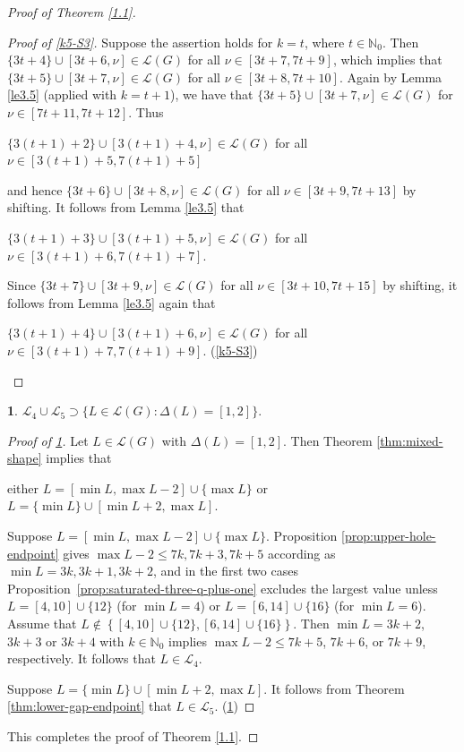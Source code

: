 \documentclass[a4paper, 10pt]{amsart}
\theoremstyle{plain}
\theoremstyle{definition}
\theoremstyle{definition}
\newtheorem{claim}{}[theorem]
\newcommand{\N}{\mathbb N}
\numberwithin{equation}{section}
\begin{document}
\begin{proof}[Proof of Theorem \ref{1.1}]
\begin{proof}[Proof of \ref{k5-S3}]
	Suppose the assertion  holds for $k=t$, where $t\in \N_0$. Then $\{3t+4\}\cup [3t+6, \nu]\in \mathcal L(G) $ for all $\nu\in [3t+7, 7t+9]$, which implies that
	$\{3t+5\}\cup [3t+7, \nu]\in \mathcal L(G) $ for all $\nu\in [3t+8, 7t+10]$. Again by Lemma \ref{le3.5} (applied with $k=t+1$), we have that
	$\{3t+5\}\cup [3t+7, \nu]\in \mathcal L(G) $ for
	$\nu\in [7t+11, 7t+12]$. Thus
	\begin{center}
	$\{3(t+1)+2\}\cup [3(t+1)+4, \nu]\in \mathcal L(G) $ for all $\nu\in [3(t+1)+5, 7(t+1)+5]$
\end{center} and hence $\{3t+6\}\cup [3t+8, \nu]\in \mathcal L(G) $ for all $\nu\in [3t+9, 7t+13]$ by shifting. It follows from Lemma
	\ref{le3.5} that
	\begin{center}
	$\{3(t+1)+3\}\cup [3(t+1)+5, \nu]\in \mathcal L(G) $ for all $\nu\in [3(t+1)+6, 7(t+1)+7]$.
	\end{center} Since $\{3t+7\}\cup [3t+9, \nu]\in \mathcal L(G) $ for all $\nu\in [3t+10, 7t+15]$ by shifting, it follows from Lemma
	\ref{le3.5} again that 
	\begin{center}
	\hspace{2cm}	$\{3(t+1)+4\}\cup [3(t+1)+6, \nu]\in \mathcal L(G) $ for all $\nu\in [3(t+1)+7, 7(t+1)+9]$.	
		\qedhere (\ref{k5-S3})
	\end{center}
\end{proof}

\begin{claim}\label{k5-S4}  $\mathcal L_4\cup \mathcal L_5\supset \big\{ L\in \mathcal L(G)\colon \Delta (L)=[1,2] \big\}$.
\end{claim}

\begin{proof}[Proof of \ref{k5-S4}]
Let $L\in \mathcal L(G)$ with $\Delta(L)=[1,2]$. Then Theorem
\ref{thm:mixed-shape} implies that  \begin{center}
	either $L=[\min L, \max L-2]\cup \{\max L\}$ or $L=\{\min L\}\cup [\min L+2, \max L]$.
\end{center}

Suppose $L=[\min L, \max L-2]\cup \{\max L\}$.  Proposition
\ref{prop:upper-hole-endpoint} gives $\max L - 2 \le 7k, 7k+3, 7k+5$
according as $\min L = 3k, 3k+1, 3k+2$, and in the first two cases
Proposition~\ref{prop:saturated-three-q-plus-one} excludes the largest value
unless $L = [4,10] \cup \{12\}$ (for $\min L = 4$) or
$L = [6,14] \cup \{16\}$ (for $\min L = 6$). Assume that $L\not\in \left\{[4,10] \cup \{12\}, [6,14] \cup \{16\}\right\}$. Then
  $\min L = 3k+2$,
$3k+3$ or $3k+4$ with $k \in \N_0$ implies $\max L - 2 \le 7k+5$, $7k+6$, or $7k+9$, respectively.  It follows that
$L\in\mathcal L_4$.

Suppose $L=\{\min L\}\cup [\min L+2, \max L]$. It follows from
Theorem \ref{thm:lower-gap-endpoint} that $L\in \mathcal L_5$. \qedhere (\ref{k5-S4})
\end{proof}
This completes the proof of Theorem \ref{1.1}.
\end{proof}




\end{document}
